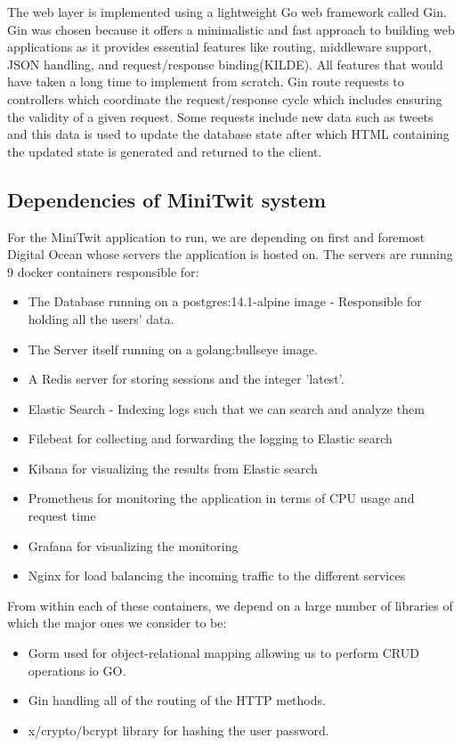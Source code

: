 The web layer is implemented using a lightweight Go web framework called Gin. 
Gin was chosen because it offers a minimalistic and fast approach to building web applications as it provides 
essential features like routing, middleware support, JSON handling, and request/response binding(KILDE). 
All features that would have taken a long time to implement from scratch. Gin route requests to controllers 
which coordinate the request/response cycle which includes ensuring the validity of a given request. 
Some requests include new data such as tweets and this data is used to update the database state after 
which HTML containing the updated state is generated and returned to the client. 


\subsection{Dependencies of MiniTwit system}

For the MiniTwit application to run, we are depending on first and foremost Digital Ocean whose servers the application is 
hosted on. The servers are running 9 docker containers responsible for: 
\begin{itemize}
    \item The Database running on a postgres:14.1-alpine image - Responsible for holding all the users' data.
    \item The Server itself running on a golang:bullseye image.
    \item A Redis server for storing sessions and the integer 'latest'.
    \item Elastic Search - Indexing logs such that we can search and analyze them
    \item Filebeat for collecting and forwarding the logging to Elastic search
    \item Kibana for visualizing the results from Elastic search
    \item Prometheus for monitoring the application in terms of CPU usage and request time
    \item Grafana for visualizing the monitoring
    \item Nginx for load balancing the incoming traffic to the different services
\end{itemize}

From within each of these containers, we depend on a large number of libraries of which the major ones we consider to be:
\begin{itemize}
    \item Gorm used for object-relational mapping allowing us to perform CRUD operations io GO.
    \item Gin handling all of the routing of the HTTP methods.
    \item x/crypto/bcrypt library for hashing the user password.
\end{itemize}

